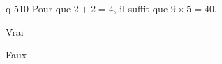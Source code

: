 \begin{truefalse}{q-510}
Pour que $2+2=4$, il suffit que $9\times 5 = 40$.
\item* Vrai
\item Faux
\end{truefalse}

